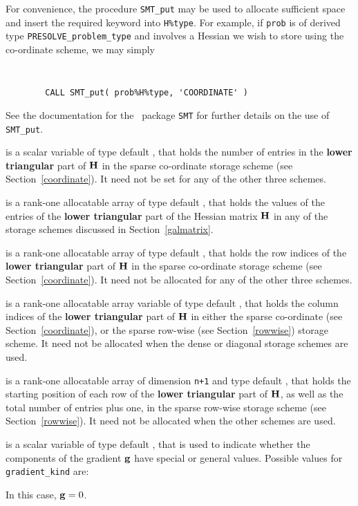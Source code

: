 \documentclass{galahad}
\newcommand{\packagename}{PRESOLVE}
\begin{document}
\begin{description}
\begin{description}
For convenience, the procedure {\tt SMT\_put}
may be used to allocate sufficient space and insert the required keyword
into {\tt H\%type}.
For example, if {\tt prob} is of derived type {\tt \packagename\_problem\_type}
and involves a Hessian we wish to store using the co-ordinate scheme,
we may simply
{\tt
\begin{verbatim}
        CALL SMT_put( prob%H%type, 'COORDINATE' )
\end{verbatim}
}
\noindent
See the documentation for the \galahad\ package {\tt SMT}
for further details on the use of {\tt SMT\_put}.

 is a scalar variable of type default \integer, that
holds the number of entries in the {\bf lower triangular} part of ${\mathbf{H}}$
in the sparse co-ordinate storage scheme (see Section~\ref{coordinate}).
It need not be set for any of the other three schemes.

 is a rank-one allocatable array of type default \realdp, that holds
the values of the entries of the {\bf lower triangular} part
of the Hessian matrix ${\mathbf{H}}$ in any of the
storage schemes discussed in Section~\ref{galmatrix}.

 is a rank-one allocatable array of type default \integer,
that holds the row indices of the {\bf lower triangular} part of ${\mathbf{H}}$
in the sparse co-ordinate storage
scheme (see Section~\ref{coordinate}).
It need not be allocated for any of the other three schemes.

 is a rank-one allocatable array variable of type default \integer,
that holds the column indices of the {\bf lower triangular} part of
${\mathbf{H}}$ in either the sparse co-ordinate
(see Section~\ref{coordinate}), or the sparse row-wise
(see Section~\ref{rowwise}) storage scheme.
It need not be allocated when the dense or diagonal storage schemes are used.

 is a rank-one allocatable array of dimension {\tt n+1} and type
default \integer, that holds the starting position of
each row of the {\bf lower triangular} part of ${\mathbf{H}}$, as well
as the total number of entries plus one, in the sparse row-wise storage
scheme (see Section~\ref{rowwise}). It need not be allocated when the
other schemes are used.

\end{description}

 is a scalar variable of type default \integer,
that is used to indicate whether the components of the gradient ${\mathbf{g}}$
have special or general values. Possible values for {\tt gradient\_kind} are:
\begin{description}
  In this case, ${\mathbf{g}} = 0$.


\end{description}
\end{description}
\end{document}
